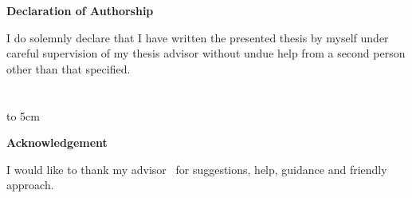 {\vfill\noindent\mfplacedate\hfill\mfauthor}
\newpage

\pagestyle{plain}

\vspace*{8cm}
\begin{centering}
  {\textbf{Declaration of Authorship}}
\end{centering}
\bigskip\bigskip

\begin{centering}
  \begin{minipage}{0.72\textwidth}
  I do solemnly declare that I have written the presented thesis by myself
  under careful supervision of my thesis advisor without undue help from
  a second person other than that specified.
  \\ \\ \\
  \hfill\hbox to 5cm{\dotfill}
  \end{minipage}
\end{centering}

\newpage

\vspace*{7cm}
\begin{centering}
  {\textbf{Acknowledgement}}
\end{centering}
\bigskip\bigskip

I would like to thank my advisor \mfadvisor\ for suggestions, help, guidance and
friendly approach.
\vspace{1cm}
